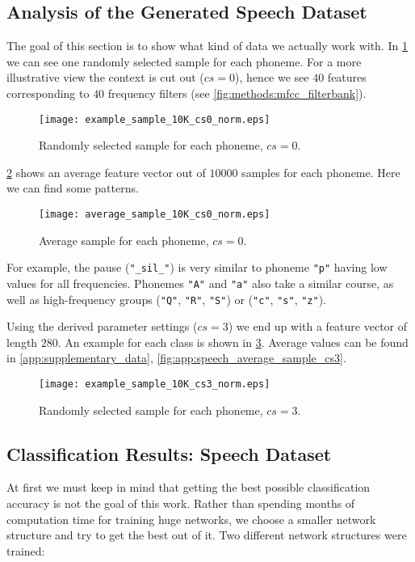 \subsection*{Analysis of the Generated Speech Dataset}
The goal of this section is to show what kind of data we actually work with. In \cref{fig:examples:speech_example_sample_cs0} we can see one randomly selected sample for each phoneme. For a more illustrative view the context is cut out ($ cs = 0 $), hence we see $ 40 $ features corresponding to $ 40 $ frequency filters (see \cref{fig:methods:mfcc_filterbank}).

\begin{figure}[H]
\centering
\texttt{[image: example\_sample\_10K\_cs0\_norm.eps]}
\caption{Randomly selected sample for each phoneme, $ cs = 0 $.}
\label{fig:examples:speech_example_sample_cs0}
\end{figure}

\cref{fig:examples:speech_average_sample_cs0} shows an average feature vector out of $ 10000 $ samples for each phoneme. Here we can find some patterns.

\begin{figure}[H]
\centering
\texttt{[image: average\_sample\_10K\_cs0\_norm.eps]}
\caption{Average sample for each phoneme, $ cs = 0 $.}
\label{fig:examples:speech_average_sample_cs0}
\end{figure}

For example, the pause (\texttt{"\_sil\_"}) is very similar to phoneme \texttt{"p"} having low values for all frequencies. Phonemes \texttt{"A"} and \texttt{"a"} also take a similar course, as well as high-frequency groups (\texttt{"Q"}, \texttt{"R"}, \texttt{"S"}) or (\texttt{"c"}, \texttt{"s"}, \texttt{"z"}).

Using the derived parameter settings ($ cs = 3 $) we end up with a feature vector of length $ 280 $. An example for each class is shown in \cref{fig:examples:speech_example_sample_cs3}. Average values can be found in \cref{app:supplementary_data}, \cref{fig:app:speech_average_sample_cs3}.

\begin{figure}[H]
\centering
\texttt{[image: example\_sample\_10K\_cs3\_norm.eps]}
\caption{Randomly selected sample for each phoneme, $ cs = 3 $.}
\label{fig:examples:speech_example_sample_cs3}
\end{figure}

\subsection*{Classification Results: Speech Dataset}
At first we must keep in mind that getting the best possible classification accuracy is not the goal of this work. Rather than spending months of computation time for training huge networks, we choose a smaller network structure and try to get the best out of it. Two different network structures were trained:

